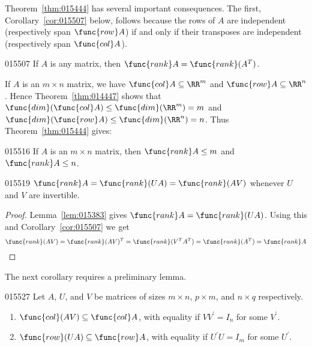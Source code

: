 Theorem~\ref{thm:015444} has several important consequences. The first, Corollary~\ref{cor:015507} below, follows because the rows of $A$ are independent (respectively span $\func{row} A$) if and only if their transposes are independent (respectively span $\func{col} A$).

\begin{corollary}{}{015507}
If $A$ is any matrix, then $\func{rank} A = \func{rank}(A^{T})$.
\end{corollary}

If $A$ is an $m \times n$ matrix, we have $\func{col} A \subseteq \RR^m$ and $\func{row} A \subseteq \RR^n$. Hence Theorem~\ref{thm:014447} shows that $\func{dim}(\func{col} A) \leq \func{dim}(\RR^m) = m$ and $\func{dim}(\func{row} A) \leq \func{dim}(\RR^n) = n$. Thus Theorem~\ref{thm:015444} gives:

\begin{corollary}{}{015516}
If $A$ is an $m \times n$ matrix, then $\func{rank }A \leq m$  and $\func{rank }A \leq n$.
\end{corollary}

\begin{corollary}{}{015519}
$\func{rank} A = \func{rank}(UA) = \func{rank}(AV)$ whenever $U$ and $V$ are invertible.
\end{corollary}

\begin{proof}
Lemma~\ref{lem:015383} gives $\func{rank} A = \func{rank}(UA)$. Using this and Corollary~\ref{cor:015507} we get
\begin{equation*}
\func{rank} (AV) = \func{rank}(AV)^T = \func{rank} (V^TA^T) = \func{rank}(A^T)= \func{rank } A
\end{equation*}
\vspace*{-2em}\end{proof}

The next corollary requires a preliminary lemma.

\begin{lemma}{}{015527}
Let $A$, $U$, and $V$ be matrices of sizes $m \times n$, $p \times m$,
and $n \times q$ respectively.

\begin{enumerate}
\item $\func{col}(AV) \subseteq \func{col} A$, with equality if $VV^{\prime}= I_{n}$ for some $V^{\prime}$.

\item $\func{row}(UA) \subseteq \func{row} A$, with equality if $U^{\prime}U=I_{m}$ for some $U^{\prime}$.

\end{enumerate}
\end{lemma}

